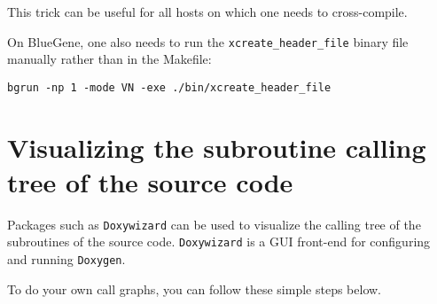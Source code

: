\noindent This trick can be useful for all hosts on which one needs
to cross-compile.

\noindent On BlueGene, one also needs to run the \texttt{xcreate\_header\_file}
binary file manually rather than in the Makefile:

\noindent
\begin{verbatim}
bgrun -np 1 -mode VN -exe ./bin/xcreate_header_file
\end{verbatim}


\section{Visualizing the subroutine calling tree of the source code}

\noindent
Packages such as \texttt{Doxywizard} can be used to visualize the calling tree of the
subroutines of the  source code. \texttt{Doxywizard} is
a GUI front-end for configuring and running \texttt{Doxygen}.

\bigskip

\noindent To do your own call graphs, you can follow these simple steps below.

